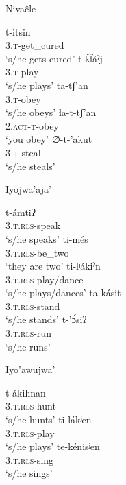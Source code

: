 \ea\label{ex:syllt:niv}
Nivaĉle \citep[248, 266, 270, 282]{JS16}
    \begin{xlist}
        \ex \gll t-itsin\\
             3.\textsc{t}-get\_cured\\
             \glt `s/he gets cured'
        \ex \gll t-k͡låˀj\\
             3.\textsc{t}-play\\
             \glt `s/he plays'
        \ex \gll ta-tʃ'an\\
             3.\textsc{t}-obey\\
             \glt `s/he obeys'
        \ex \gll ɬa-t-tʃ'an\\
             2.\textsc{act-t}-obey\\
             \glt `you obey'
        \ex \gll ∅-t-’akut\\
             3-\textsc{t}-steal\\
             \glt `s/he steals'
    \end{xlist}
\z

\ea\label{ex:syllt:ijw}
Iyojwa'aja' \citep{JC14a}
    \begin{xlist}
        \ex \gll t-ámtiʔ\\
             3.\textsc{t.rls}-speak\\
             \glt `s/he speaks'
        \ex \gll ti-més\\
             3.\textsc{t.rls}-be\_two\\
             \glt `they are two'
        \ex \gll ti-lʲákiˀn\\
             3.\textsc{t.rls}-play/dance\\
             \glt `s/he plays/dances'
        \ex \gll ta-kásit\\
             3.\textsc{t.rls}-stand\\
             \glt `s/he stands'
        \ex \gll t-'ɔ́siʔ\\
             3.\textsc{t.rls}-run\\
             \glt `s/he runs'
    \end{xlist}
\z

\ea\label{ex:syllt:i'w}
Iyo'awujwa' \citep[75]{AG83}
    \begin{xlist}
        \ex \gll t-ákihnan\\
             3.\textsc{t.rls}-hunt\\
             \glt `s/he hunts'
        \ex \gll ti-lákʲen\\
             3.\textsc{t.rls}-play\\
             \glt `s/he plays'
        \ex \gll te-kénisʲen\\
             3.\textsc{t.rls}-sing\\
             \glt `s/he sings'
    \end{xlist}
\z

